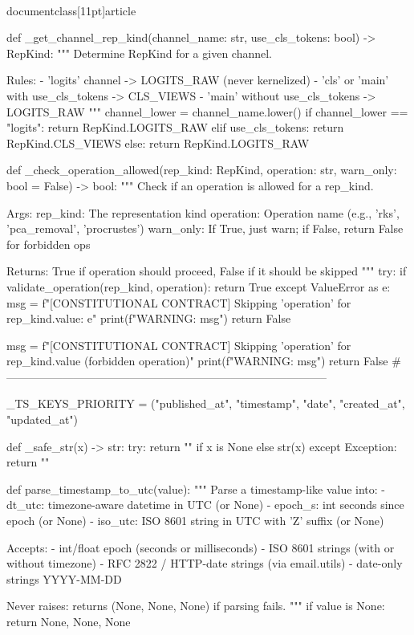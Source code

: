 \\documentclass[11pt]{article}
\begin{document}
\begin{CodeBlock}
def _get_channel_rep_kind(channel_name: str, use_cls_tokens: bool) -> RepKind:
    """
    Determine RepKind for a given channel.
    
    Rules:
    - 'logits' channel -> LOGITS_RAW (never kernelized)
    - 'cls' or 'main' with use_cls_tokens -> CLS_VIEWS
    - 'main' without use_cls_tokens -> LOGITS_RAW
    """
    channel_lower = channel_name.lower()
    if channel_lower == "logits":
        return RepKind.LOGITS_RAW
    elif use_cls_tokens:
        return RepKind.CLS_VIEWS
    else:
        return RepKind.LOGITS_RAW


def _check_operation_allowed(rep_kind: RepKind, operation: str, warn_only: bool = False) -> bool:
    """
    Check if an operation is allowed for a rep_kind.

    Args:
        rep_kind: The representation kind
        operation: Operation name (e.g., 'rks', 'pca_removal', 'procrustes')
        warn_only: If True, just warn; if False, return False for forbidden ops

    Returns:
        True if operation should proceed, False if it should be skipped
    """
    try:
        if validate_operation(rep_kind, operation):
            return True
    except ValueError as e:
        msg = f"[CONSTITUTIONAL CONTRACT] Skipping '{operation}' for {rep_kind.value}: {e}"
        print(f"WARNING: {msg}")
        return False

    msg = f"[CONSTITUTIONAL CONTRACT] Skipping '{operation}' for {rep_kind.value} (forbidden operation)"
    print(f"WARNING: {msg}")
    return False
# --------------------------------------------------------------------------------------

_TS_KEYS_PRIORITY = ("published_at", "timestamp", "date", "created_at", "updated_at")


def _safe_str(x) -> str:
    try:
        return "" if x is None else str(x)
    except Exception:
        return ""


def parse_timestamp_to_utc(value):
    """
    Parse a timestamp-like value into:
      - dt_utc: timezone-aware datetime in UTC (or None)
      - epoch_s: int seconds since epoch (or None)
      - iso_utc: ISO 8601 string in UTC with 'Z' suffix (or None)

    Accepts:
      - int/float epoch (seconds or milliseconds)
      - ISO 8601 strings (with or without timezone)
      - RFC 2822 / HTTP-date strings (via email.utils)
      - date-only strings YYYY-MM-DD

    Never raises: returns (None, None, None) if parsing fails.
    """
    if value is None:
        return None, None, None


\end{CodeBlock}
\end{document}
